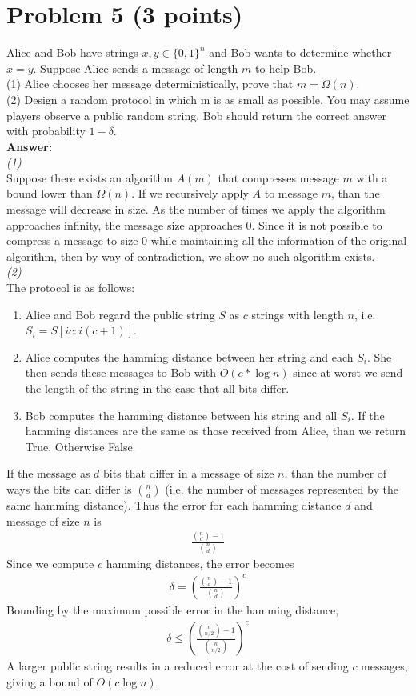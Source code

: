 \documentclass[letterpaper, 11pt]{article}
\begin{document}
\section*{Problem 5 (3 points)}
Alice and Bob have strings $x, y \in \{0, 1\} ^n$ and Bob wants to determine whether $x = y$.
Suppose Alice sends a message of length $m$ to help Bob.\\
(1) Alice chooses her message deterministically, prove that $m = \Omega(n)$.\\
(2) Design a random protocol in which m is as small as possible. You may assume players
observe a public random string. Bob should return the correct answer with probability $1-\delta$. \\
\textbf{Answer:} \\
\emph{(1)} \\
Suppose there exists an algorithm $A(m)$ that compresses message $m$ with a bound lower than $\Omega(n)$. If we recursively apply $A$ to message $m$, than the message will decrease in size. As the number of times we apply the algorithm approaches infinity, the message size approaches 0. Since it is not possible to compress a message to size 0 while maintaining all the information of the original algorithm, then by way of contradiction, we show no such algorithm exists.\\
\emph{(2)}\\
The protocol is as follows:
\begin{enumerate}
	\item Alice and Bob regard the public string $S$ as $c$ strings with length $n$, i.e. $S_i = S[ic : i(c+1)]$.
	\item Alice computes the hamming distance between her string and each $S_i$. She then sends these messages to Bob with $O(c * \log n)$ since at worst we send the length of the string in the case that all bits differ.
	\item Bob computes the hamming distance between his string and all $S_i$. If the hamming distances are the same as those received from Alice, than we return True. Otherwise False.
\end{enumerate}
If the message as $d$ bits that differ in a message of size $n$, than the number of ways the bits can differ is $n \choose d$ (i.e. the number of messages represented by the same hamming distance). Thus the error for each hamming distance $d$ and message of size $n$ is
\begin{align}
\frac{{n \choose d} - 1}{{n \choose d}}
\end{align}
Since we compute $c$ hamming distances, the error becomes
\begin{align}
\delta = \left(\frac{{n \choose d} - 1} {{n \choose d}} \right)^c
\end{align}
Bounding by the maximum possible error in the hamming distance,
\begin{align}
\delta \leq \left(\frac{{n \choose n/2} - 1} {{n \choose n/2}} \right)^c
\end{align}
A larger public string results in a reduced error at the cost of sending $c$ messages, giving a bound of $O(c \log n)$.
\end{document}
